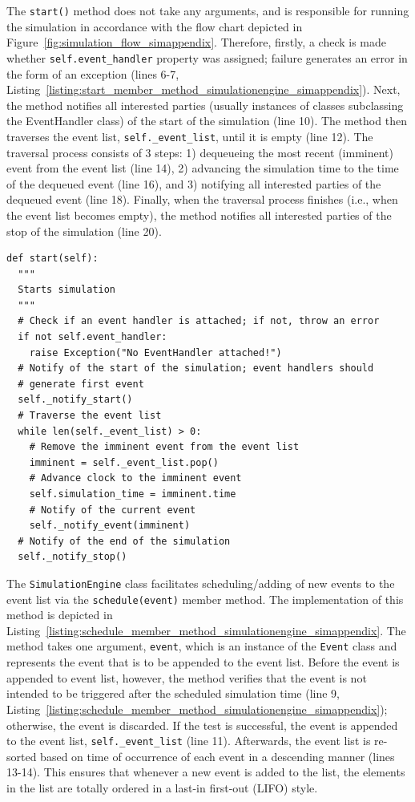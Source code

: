 The \lstinline{start()} method does not take any arguments, and is responsible for running the simulation in accordance with the flow chart depicted in Figure~\ref{fig:simulation_flow_simappendix}. Therefore, firstly, a check is made whether \lstinline{self.event_handler} property was assigned; failure generates an error in the form of an exception (lines 6-7, Listing~\ref{listing:start_member_method_simulationengine_simappendix}). Next, the method notifies all interested parties (usually instances of classes subclassing the EventHandler class) of the start of the simulation (line 10). The method then traverses the event list, \lstinline{self._event_list}, until it is empty (line 12). The traversal process consists of 3 steps: 1) dequeueing the most recent (imminent) event from the event list (line 14), 2) advancing the simulation time to the time of the dequeued event (line 16), and 3) notifying all interested parties of the dequeued event (line 18). Finally, when the traversal process finishes (i.e., when the event list becomes empty), the method notifies all interested parties of the stop of the simulation (line 20).

\begin{lstlisting}[caption=\lstinline{start()} member method of the \lstinline{SimulationEngine} class, label=listing:start_member_method_simulationengine_simappendix]
def start(self):
  """
  Starts simulation
  """
  # Check if an event handler is attached; if not, throw an error
  if not self.event_handler:
    raise Exception("No EventHandler attached!")
  # Notify of the start of the simulation; event handlers should
  # generate first event
  self._notify_start()
  # Traverse the event list
  while len(self._event_list) > 0:
    # Remove the imminent event from the event list
    imminent = self._event_list.pop()
    # Advance clock to the imminent event
    self.simulation_time = imminent.time
    # Notify of the current event
    self._notify_event(imminent)
  # Notify of the end of the simulation
  self._notify_stop()
\end{lstlisting}

The \lstinline{SimulationEngine} class facilitates scheduling/adding of new events to the event list via the \lstinline{schedule(event)} member method. The implementation of this method is depicted in Listing~\ref{listing:schedule_member_method_simulationengine_simappendix}. The method takes one argument, \lstinline{event}, which is an instance of the \lstinline{Event} class and represents the event that is to be appended to the event list. Before the event is appended to event list, however, the method verifies that the event is not intended to be triggered after the scheduled simulation time (line 9, Listing~\ref{listing:schedule_member_method_simulationengine_simappendix}); otherwise, the event is discarded. If the test is successful, the event is appended to the event list, \lstinline{self._event_list} (line 11). Afterwards, the event list is re-sorted based on time of occurrence of each event in a descending manner (lines 13-14). This ensures that whenever a new event is added to the list, the elements in the list are totally ordered in a last-in first-out (LIFO) style.

